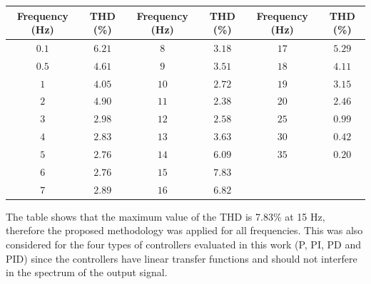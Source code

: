 \begin{table}[H]
	\label{table:B_THD}
	\centering
	\resizebox{14cm}{!} {
		\begin{tabular}{|c|c|c|c|c|c|}
			\hline
			Frequency (Hz)  & THD (\%) & Frequency (Hz) & THD (\%) & Frequency (Hz) & THD (\%) \\ \hline
			$0.1$ & $6.21$  & $8$  & $3.18$ & $17$ & $5.29$ \\ \hline
			$0.5$ & $4.61$  & $9$  & $3.51$ & $18$ & $4.11$ \\ \hline
			$1$   & $4.05$  & $10$ & $2.72$ & $19$ & $3.15$ \\ \hline
			$2$   & $4.90$  & $11$ & $2.38$ & $20$ & $2.46$	\\ \hline
			$3$   & $2.98$  & $12$ & $2.58$ & $25$ & $0.99$	\\ \hline
			$4$   & $2.83$  & $13$ & $3.63$ & $30$ & $0.42$	\\ \hline	
			$5$   & $2.76$  & $14$ & $6.09$ & $35$ & $0.20$	\\ \hline	
			$6$   & $2.76$  & $15$ & $7.83$ &      &  		\\ \hline	
			$7$   & $2.89$  & $16$ & $6.82$ &      &  		\\ \hline	
	\end{tabular}}
\end{table}

The table shows that the maximum value of the THD is 7.83\% at 15 Hz, therefore the proposed methodology was applied for all frequencies. This was also considered for the four types of controllers evaluated in this work (P, PI, PD and PID) since the controllers have linear transfer functions and should not interfere in the spectrum of the output signal. 




